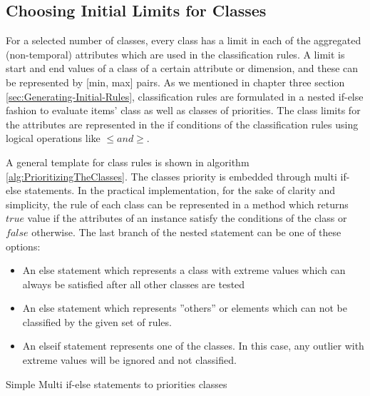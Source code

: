 \subsection{Choosing Initial Limits for Classes}
\label{sec:Choosing_Initial_Limits_for_Classes}
For a selected number of classes, every class has a limit in each of the aggregated (non-temporal) attributes which are used in the classification rules. A limit is start and end values of a class of a certain attribute or dimension, and these can be represented by [min, max] pairs. As we mentioned in chapter three section \ref{sec:Generating-Initial-Rules}, classification rules are formulated in a nested if-else fashion to evaluate items' class as well as classes of priorities. The class limits for the attributes are represented in the if conditions of the classification rules using logical operations like $\leqslant and \geqslant$. 

A general template for class rules is shown in algorithm \ref{alg:PrioritizingTheClasses}. The classes priority is embedded through multi if-else statements. In the practical implementation,  for the sake of clarity and simplicity, the rule of each class can be represented in a method which returns $true$ value if the attributes of an instance satisfy the conditions of the class or $false$ otherwise. The last branch of the nested statement can be one of these options:
\begin{itemize}
    \item An else statement which represents a class with extreme values which can always be satisfied after all other classes are tested
    \item An else statement which represents ''others'' or elements which can not be classified by the given set of rules. 
    \item An elseif statement represents one of the classes. In this case, any outlier with extreme values will be ignored and not classified.
\end{itemize}

\begin{algorithm}[!h]
    \SetAlgoLined
    \caption{Simple Multi if-else statements to priorities classes}
    \label{alg:PrioritizingTheClasses}
\end{algorithm}

